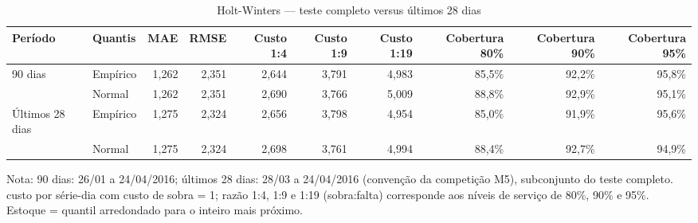 \begin{table}[htbp]
\centering
\small
\caption{Holt-Winters — teste completo versus últimos 28 dias}
\label{tab:hw_verificacao_28d}
\begin{tabular}{llrrrrrrrr}
\toprule
Período & Quantis & MAE & RMSE & Custo 1:4 & Custo 1:9 & Custo 1:19 & Cobertura 80\% & Cobertura 90\% & Cobertura 95\% \\
\midrule
90 dias & Empírico & 1,262 & 2,351 & 2,644 & 3,791 & 4,983 & 85,5\% & 92,2\% & 95,8\% \\
 & Normal & 1,262 & 2,351 & 2,690 & 3,766 & 5,009 & 88,8\% & 92,9\% & 95,1\% \\
\addlinespace
Últimos 28 dias & Empírico & 1,275 & 2,324 & 2,656 & 3,798 & 4,954 & 85,0\% & 91,9\% & 95,6\% \\
 & Normal & 1,275 & 2,324 & 2,698 & 3,761 & 4,994 & 88,4\% & 92,7\% & 94,9\% \\
\bottomrule
\end{tabular}
\par\smallskip
{\footnotesize Nota: 90 dias: 26/01 a 24/04/2016; últimos 28 dias: 28/03 a 24/04/2016 (convenção da competição M5), subconjunto do teste completo. custo por série-dia com custo de sobra = 1; razão 1:4, 1:9 e 1:19 (sobra:falta) corresponde aos níveis de serviço de 80\%, 90\% e 95\%. Estoque = quantil arredondado para o inteiro mais próximo.}
\end{table}
